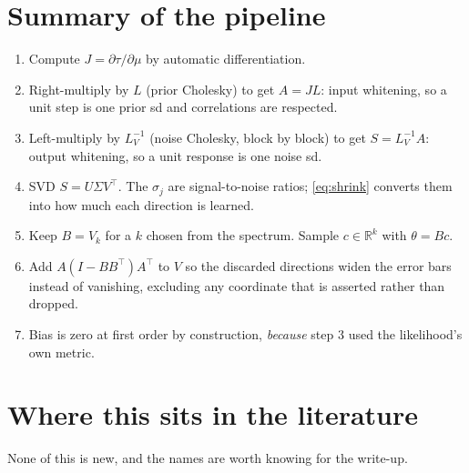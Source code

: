 \documentclass[11pt]{article}
\newcommand{\R}{\mathbb{R}}
\newcommand{\muraw}{\theta}
\begin{document}
\section{Summary of the pipeline}

\begin{enumerate}
  \item Compute $J = \partial\tau/\partial\mu$ by automatic differentiation.
  \item Right-multiply by $L$ (prior Cholesky) to get $A = JL$: input whitening,
        so a unit step is one prior sd and correlations are respected.
  \item Left-multiply by $L_V^{-1}$ (noise Cholesky, block by block) to get
        $S = L_V^{-1}A$: output whitening, so a unit response is one noise sd.
  \item SVD $S = U\Sigma V^{\top}$. The $\sigma_j$ are signal-to-noise ratios;
        \eqref{eq:shrink} converts them into how much each direction is learned.
  \item Keep $B = V_k$ for a $k$ chosen from the spectrum. Sample
        $c\in\R^k$ with $\muraw = Bc$.
  \item Add $A(I-BB^{\top})A^{\top}$ to $V$ so the discarded directions widen the
        error bars instead of vanishing, excluding any coordinate that is
        asserted rather than dropped.
  \item Bias is zero at first order by construction, \emph{because} step 3 used
        the likelihood's own metric.
\end{enumerate}

\section{Where this sits in the literature}

None of this is new, and the names are worth knowing for the write-up.
\end{document}
